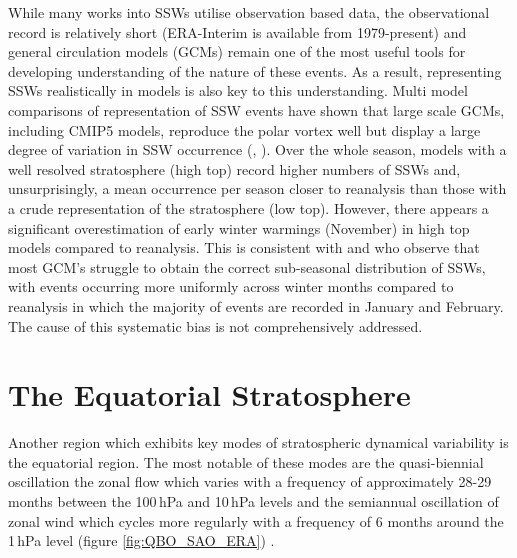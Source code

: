 {While many works into SSWs utilise observation based data, the observational record is relatively short (ERA-Interim is available from 1979-present) and general circulation models (GCMs) remain one of the most useful tools for developing understanding of the nature of these events. As a result, representing SSWs realistically in models is also key to this understanding. Multi model comparisons of representation of SSW events have shown that large scale GCMs, including CMIP5 models, reproduce the polar vortex well but display a large degree of variation in SSW occurrence (\cite{Kim2017}, \cite{Butchart2011}). Over the whole season, models with a well resolved stratosphere (high top) record higher numbers of SSWs and, unsurprisingly, a mean occurrence per season closer to reanalysis than those with a crude representation of the stratosphere (low top). However, there appears a significant overestimation of early winter warmings (November) in high top models compared to reanalysis. This is consistent with \cite{Charlton2007} and \cite{Schmidt2013} who observe that most GCM’s struggle to obtain the correct sub-seasonal distribution of SSWs, with events occurring more uniformly across winter months compared to reanalysis in which the majority of events are recorded in January and February. The cause of this systematic bias is not comprehensively addressed.


\section{The Equatorial Stratosphere}\label{sec:equatorial_strat}
Another region which exhibits key modes of stratospheric dynamical variability is the equatorial region. The most notable of these modes are the quasi-biennial oscillation the zonal flow which varies with a frequency of approximately 28-29 months between the 100\,hPa and 10\,hPa levels and the semiannual oscillation of zonal wind which cycles more regularly with a frequency of 6 months around the 1\,hPa level (figure \ref{fig:QBO_SAO_ERA}) \citep{Baldwin2001}.

}
